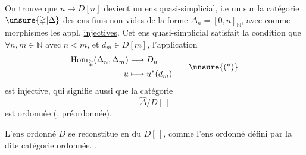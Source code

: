 On trouve que $n\longmapsto D[n]$ devient un ens quasi-simplicial, i.e un  sur la catégorie $\unsure{\mathbb{\Delta}|\Delta}$ des ens finis non vides de la forme $\Delta_n=[0,n]_{\mathbb N}$, avec comme
morphismes les appl. \uline{injectives}. Cet ens quasi-simplicial satisfait la condition que
$\forall n,m\in\mathbb N$ avec $n<m$, et $d_m\in D[m]$, l'application
\[
\begin{aligned}
\mathrm{Hom}_{\mathbb{\Delta}}(\Delta_n,\Delta_m)&\longrightarrow D_n\\
u&\longmapsto u^*(d_m)
\end{aligned}\tag*{\unsure{(*)}}
\]
est injective, qui signifie aussi que la catégorie
\[
\widehat{\mathbb{\Delta}}/D[\,]
\]
est ordonnée (, préordonnée).

L'ens ordonné $D$ se reconstitue en   du $D[\,]$, comme l'ens ordonné  défini par la dite catégorie ordonnée. , 
